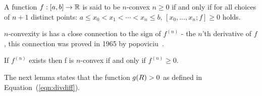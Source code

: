 \documentclass{article}[12pt]
\begin{document}
\begin{definition}[$n$-convexity]
 A function $f:[a,b] \to \mathbb{R}$ is said to be $n$-convex  $n \geq 0$
 if and only if for all choices of $n+1$ distinct points: $a \leq x_0 < x_1
  < \cdots < x_n \leq b$, $[x_0,\ldots,x_n;f]\geq 0$ holds.
\end{definition}
$n$-convexity is has a close connection to the sign of $f^{(n)}$ - the $n$'th
derivative of $f$, this connection was proved in 1965 by
popoviciu~\cite{popoviciu1965certaines}.
\begin{theorem} \label{thm:popo}
If $f^{(n)}$ exists then f is $n$-convex if and only if $f^{(n)}\geq 0$.
\end{theorem}

The next lemma states that the function $g(R)>0$ as defined in
Equation~(\ref{eqn:divdiff}).
\end{document}
